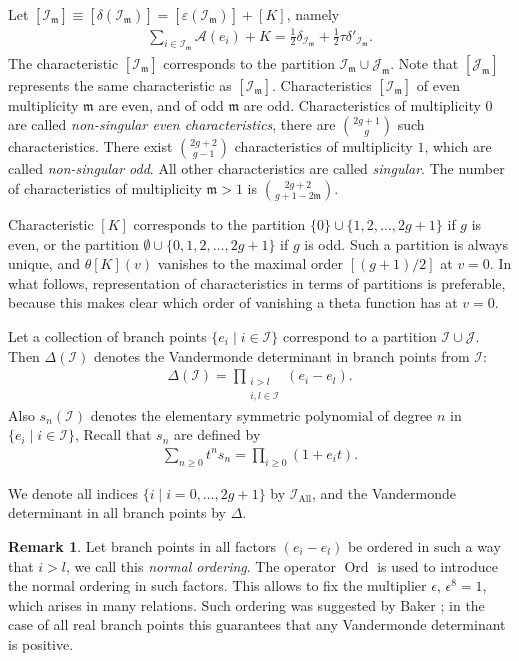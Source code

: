 \documentclass[twoside]{amsart}
\newcommand{\I}{\mathcal{I}}
\newcommand{\J}{\mathcal{J}}
\newcommand{\mFr}{\mathfrak{m}}
\DeclareMathOperator{\Ord}{Ord}
\theoremstyle{definition}
\newtheorem{rem}{Remark}[section]
\theoremstyle{plain}
\begin{document}
Let $[\I_\mFr] \equiv [\delta(\I_\mFr)]  = [\varepsilon(\I_\mFr)] + [K]$, namely 
\begin{gather*}
 \sum_{i\in\I_\mFr} \mathcal{A}(e_i) + K = \frac{1}{2}\delta_{\I_\mFr} + \frac{1}{2}\tau \delta'_{\I_\mFr}.
\end{gather*}
The characteristic $[\I_\mFr]$  corresponds to the partition $\I_\mFr \cup \J_\mFr$. 
Note that $[\J_\mFr]$ represents the same characteristic as $[\I_\mFr]$.
Characteristics $[\I_\mFr]$ of even multiplicity $\mFr$ are even, and of odd $\mFr$ are odd.
Characteristics of multiplicity $0$ are called \emph{non-singular even characteristics},
there are $\binom{2g+1}{g}$ such characteristics.
There exist $\binom{2g+2}{g-1}$ characteristics of multiplicity $1$, which are called \emph{non-singular odd}.
All other characteristics are called \emph{singular}.
The number of characteristics of multiplicity $\mFr > 1$ is $\binom{2g+2}{g+1-2\mFr}$.


Characteristic $[K]$ corresponds to the partition $\{0\}\cup\{1,2,\dots,2g+1\}$ if $g$ is even,
or the partition $\emptyset \cup\{0, 1,2,\dots,2g+1\}$ if $g$ is odd. Such a partition is always unique, and
$\theta[K](v)$ vanishes to the maximal order $[(g+1)/2]$ at $v=0$.
In what follows, representation of characteristics in terms of partitions is preferable, 
because this makes clear which order of vanishing a theta function has at $v=0$.

Let a collection of branch points $\{e_i\mid i\in \mathcal{I}\}$ 
correspond to a partition $\I \cup \J$.
Then  $\Delta(\I)$ denotes the Vandermonde determinant in branch points from $\I$:
\begin{gather*}
 \Delta(\I) = \prod_{\substack{i > l \\ i,l \in \I}} (e_i-e_l).
\end{gather*}
Also  $s_n(\I)$ denotes the elementary symmetric polynomial of degree $n$ in  $\{e_i\mid i\in\I\}$,
Recall that  $s_n$ are defined by
\begin{gather*}
\sum_{n \geqslant 0} t^n s_n = \prod_{i\geqslant 0} (1+e_i t).
\end{gather*}

We denote all indices $\{i \mid i=0,\dots, 2g+1\}$ by $\I_{\text{All}}$, and
 the Vandermonde determinant in all branch points by $\Delta$.

\begin{rem}\label{R:NormMOrd}
 Let branch points in all factors $(e_i-e_l)$ be ordered in such a way that $i>l$, 
 we call this  \emph{normal ordering}. The operator $\Ord$ is used to introduce 
 the normal ordering in such factors.
 This allows to fix the multiplier $\epsilon$, $\epsilon^8=1$, which arises in many relations. 
 Such ordering was suggested by Baker \cite[p.\,346]{bak898}; in the case of all real branch points
 this guarantees that any Vandermonde determinant is positive.
\end{rem}
\end{document}
